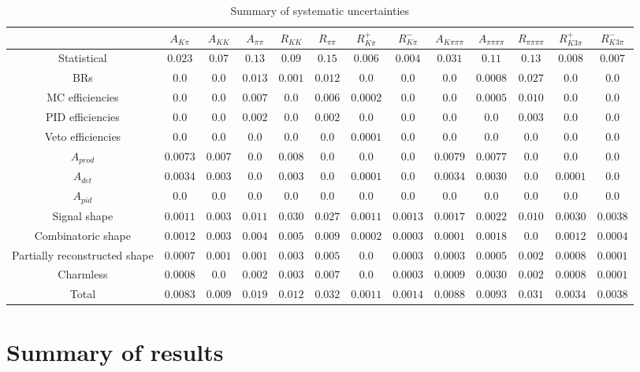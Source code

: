 \begin{table}
\centering
{\footnotesize
\begin{tabular}{ccccccccccccc}
\hline
& $A_{K\pi}$ & $A_{KK}$ & $A_{\pi\pi}$ & $R_{KK}$ & $R_{\pi\pi}$ & $R^+_{K\pi}$ & $R^-_{K\pi}$ & $A_{K\pi\pi\pi}$ & $A_{\pi\pi\pi\pi}$ & $R_{\pi\pi\pi\pi}$ & $R^+_{K3\pi}$ & $R^-_{K3\pi}$ \\
\hline
Statistical & $0.023$ & $0.07$ & $0.13$ & $0.09$ & $0.15$ & $0.006$ & $0.004$ & $0.031$ & $0.11$ & $0.13$ & $0.008$ & $0.007$ \\
\hline
BRs  & $0.0$ & $0.0$ & $0.013$ & $0.001$ & $0.012$ & $0.0$ & $0.0$ & $0.0$ & $0.0008$ & $0.027$ & $0.0$ & $0.0$ \\
MC efficiencies  & $0.0$ & $0.0$ & $0.007$ & $0.0$ & $0.006$ & $0.0002$ & $0.0$ & $0.0$ & $0.0005$ & $0.010$ & $0.0$ & $0.0$ \\
PID efficiencies  & $0.0$ & $0.0$ & $0.002$ & $0.0$ & $0.002$ & $0.0$ & $0.0$ & $0.0$ & $0.0$ & $0.003$ & $0.0$ & $0.0$ \\
Veto efficiencies  & $0.0$ & $0.0$ & $0.0$ & $0.0$ & $0.0$ & $0.0001$ & $0.0$ & $0.0$ & $0.0$ & $0.0$ & $0.0$ & $0.0$ \\
$A_{prod}$  & $0.0073$ & $0.007$ & $0.0$ & $0.008$ & $0.0$ & $0.0$ & $0.0$ & $0.0079$ & $0.0077$ & $0.0$ & $0.0$ & $0.0$ \\
$A_{det}$  & $0.0034$ & $0.003$ & $0.0$ & $0.003$ & $0.0$ & $0.0001$ & $0.0$ & $0.0034$ & $0.0030$ & $0.0$ & $0.0001$ & $0.0$ \\
$A_{pid}$ & $0.0$ & $0.0$ & $0.0$ & $0.0$ & $0.0$ & $0.0$ & $0.0$ & $0.0$ & $0.0$ & $0.0$ & $0.0$ & $0.0$ \\
Signal shape & $0.0011$ & $0.003$ & $0.011$ & $0.030$ & $0.027$ & $0.0011$ & $0.0013$ & $0.0017$ & $0.0022$ & $0.010$ & $0.0030$ & $0.0038$ \\
Combinatoric shape  & $0.0012$ & $0.003$ & $0.004$ & $0.005$ & $0.009$ & $0.0002$ & $0.0003$ & $0.0001$ & $0.0018$ & $0.0$ & $0.0012$ & $0.0004$ \\
Partially reconstructed shape  & $0.0007$ & $0.001$ & $0.001$ & $0.003$ & $0.005$ & $0.0$ & $0.0003$ & $0.0003$ & $0.0005$ & $0.002$ & $0.0008$ & $0.0001$ \\
Charmless  & $0.0008$ & $0.0$ & $0.002$ & $0.003$ & $0.007$ & $0.0$ & $0.0003$ & $0.0009$ & $0.0030$ & $0.002$ & $0.0008$ & $0.0001$ \\
\hline
Total & $0.0083$ & $0.009$ & $0.019$ & $0.012$ & $0.032$ & $0.0011$ & $0.0014$ & $0.0088$ & $0.0093$ & $0.031$ & $0.0034$ & $0.0038$ \\
\hline
\end{tabular}}
\caption{Summary of systematic uncertainties}
\label{systematics}
\end{table}

\section{Summary of results}

\clearpage

